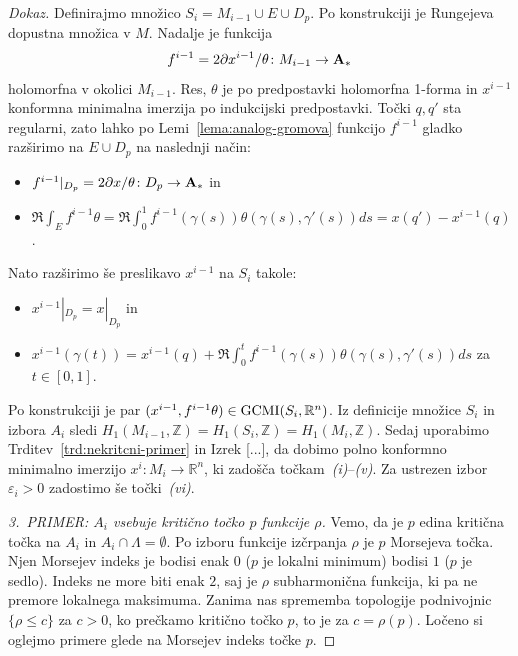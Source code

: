 \documentclass[12pt,a4paper,twoside]{article}
\theoremstyle{definition} %
\newenvironment{dokaz}[1][Dokaz]{\begin{proof}[#1]}{\end{proof}}
\theoremstyle{plain} %
\numberwithin{equation}{section}  %
\begin{document}
\begin{dokaz}
Definirajmo množico $S_{i} = M_{i-1} \cup E \cup D_{p}$. Po konstrukciji je Rungejeva dopustna množica v $M$. 
Nadalje je funkcija 
\begin{gather*}
f^{i-1} = 2 \partial x^{i-1} / \theta \colon M_{i-1} \to \textup{\textbf{A}}_{*}
\end{gather*} 
holomorfna v okolici $M_{i-1}$. Res, $\theta$ je po predpostavki holomorfna 1-forma in $x^{i-1}$ konformna minimalna imerzija po indukcijski predpostavki. 
Točki $q, q'$ sta regularni, zato lahko po Lemi~\ref{lema:analog-gromova} funkcijo $f^{i-1}$ gladko razširimo na $E \cup D_{p}$ na naslednji način:
\begin{itemize}
\item $ f^{i-1}|_{D_{p}} = 2 \partial x / \theta \colon D_{p} \to \textup{\textbf{A}}_{*} $ in
\item $ \Re \int_{E} f^{i-1} \theta = \Re \int_{0}^{1} f^{i-1}(\gamma(s)) \theta(\gamma(s), \gamma '(s)) ds = x(q') - x^{i-1}(q) $.
\end{itemize}
%
Nato razširimo še preslikavo $x^{i-1}$ na $S_{i}$ takole:
\begin{itemize}
\item $ x^{i-1}|_{D_{p}} = x|_{D_{p}} $ in
\item $ x^{i-1}(\gamma(t)) = x^{i-1}(q) + \Re \int_{0}^{t} f^{i-1}(\gamma(s)) \theta(\gamma(s), \gamma '(s)) ds$ za $t \in [0,1]$.
\end{itemize}
%
Po konstrukciji je par $(x^{i-1}, f^{i-1} \theta) \in \textup{GCMI}(S_{i}, \mathbb{R}^{n})$. Iz definicije množice $S_{i}$ in izbora $A_{i}$ sledi $H_{1}(M_{i-1}, \mathbb{Z}) = H_{1}(S_{i}, \mathbb{Z}) = H_{1}(M_{i}, \mathbb{Z})$. 
Sedaj uporabimo Trditev~\ref{trd:nekritcni-primer} in Izrek [...], %
da dobimo polno konformno minimalno imerzijo $x^{i} \colon M_{i} \to \mathbb{R}^{n}$, ki zadošča točkam~\textit{(i)}--\textit{(v)}. Za ustrezen izbor $\varepsilon_{i} > 0$ zadostimo še točki~\textit{(vi)}. \newline

\textit{3.~PRIMER: $A_{i}$ vsebuje kritično točko $p$ funkcije $\rho$.} \newline
Vemo, da je $p$ edina kritična točka na $A_{i}$ in $A_{i} \cap \Lambda = \emptyset$. Po izboru funkcije izčrpanja $\rho$ je $p$ Morsejeva točka.
Njen Morsejev indeks je bodisi enak $0$ ($p$ je lokalni minimum) bodisi $1$ ($p$ je sedlo). Indeks ne more biti enak $2$, saj je $\rho$ subharmonična funkcija, ki pa ne premore lokalnega maksimuma.
Zanima nas sprememba topologije podnivojnic $\{ \rho \leq c \}$ za $c>0$, ko prečkamo kritično točko $p$, to je za $c = \rho(p)$. Ločeno si oglejmo primere glede na Morsejev indeks točke $p$. \newline


\end{dokaz}
\end{document}

